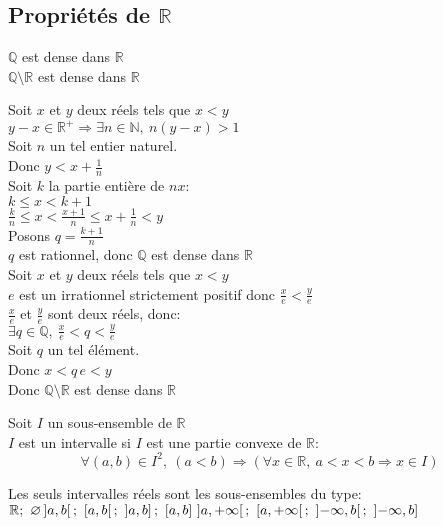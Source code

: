 \documentclass[12pt,twoside,a4paper]{article}
\begin{document}
		\subsection{Propriétés de $\mathbb{R}$}
			\begin{prop}
				$\mathbb{Q}$ est dense dans $\mathbb{R}$\\
				$\mathbb{Q}\setminus\mathbb{R}$ est dense dans $\mathbb{R}$
			\end{prop}
			\begin{preuve}
				Soit $x$ et $y$ deux réels tels que $x<y$\\
				$y-x\in\mathbb{R^+}\Rightarrow\exists n\in\mathbb{N},\ n(y-x)>1$\\
				Soit $n$ un tel entier naturel.\\
				Donc $y<x+\frac{1}{n}$\\
				Soit $k$ la partie entière de $nx$:\\
				$k\leqslant x<k+1$\\
				$\frac{k}{n}\leqslant x<\frac{x+1}{n}\leqslant x+\frac{1}{n}<y$\\
				Posons $q=\frac{k+1}{n}$\\
				$q$ est rationnel, donc $\mathbb{Q}$ est dense dans $\mathbb{R}$\\
				Soit $x$ et $y$ deux réels tels que $x<y$\\
				$e$ est un irrationnel strictement positif donc $\frac{x}{e}<\frac{y}{e}$\\
				$\frac{x}{e}$ et $\frac{y}{e}$ sont deux réels, donc:\\
				$\exists q\in\mathbb{Q},\ \frac{x}{e}<q<\frac{y}{e}$\\
				Soit $q$ un tel élément.\\
				Donc $x<q\,e<y$\\
				Donc $\mathbb{Q}\setminus\mathbb{R}$ est dense dans $\mathbb{R}$
			\end{preuve}
			\begin{defi}
				Soit $I$ un sous-ensemble de $\mathbb{R}$\\
				$I$ est un intervalle si $I$ est une partie convexe de $\mathbb{R}$:\\
				$$\forall(a,b)\in I^2,\ (a<b)\Rightarrow(\forall x\in\mathbb{R},\ a<x<b\Rightarrow x\in I)$$
			\end{defi}
			\begin{prop}
				Les seuls intervalles réels sont les sous-ensembles du type:\\
				$\mathbb{R};\ \varnothing\\
				\left]a,b\right[;\ \left[a,b\right[;\ \left]a,b\right];\ \left[a,b\right]\\
				\left]a,+\infty\right[;\ \left[a,+\infty\right[;\ \left]-\infty,b\right[;\ \left]-\infty,b\right]$
			\end{prop}
\end{document}
